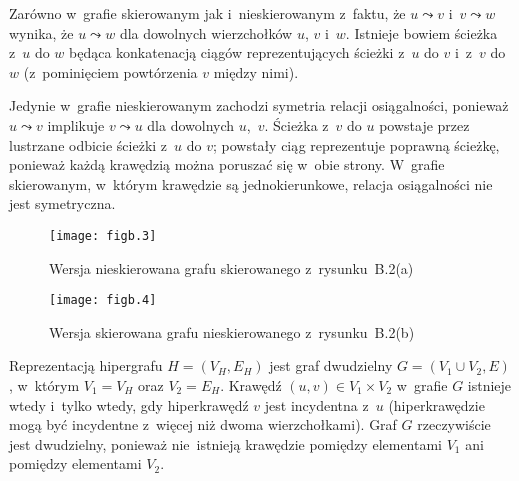 Zarówno w~grafie skierowanym jak i~nieskierowanym z~faktu, że $u\leadsto v$ i~$v\leadsto w$ wynika, że $u\leadsto w$ dla dowolnych wierzchołków $u$, $v$ i~$w$. Istnieje bowiem ścieżka z~$u$ do $w$ będąca konkatenacją ciągów reprezentujących ścieżki z~$u$ do $v$ i~z~$v$ do $w$ (z~pominięciem powtórzenia $v$ między nimi).

Jedynie w~grafie nieskierowanym zachodzi symetria relacji osiągalności, ponieważ $u\leadsto v$ implikuje $v\leadsto u$ dla dowolnych $u$,~$v$. Ścieżka z~$v$ do $u$ powstaje przez lustrzane odbicie ścieżki z~$u$ do $v$; powstały ciąg reprezentuje poprawną ścieżkę, ponieważ każdą krawędzią można poruszać się w~obie strony. W~grafie skierowanym, w~którym krawędzie są jednokierunkowe, relacja osiągalności nie jest symetryczna.

\exercise %
\begin{figure}[ht]
	\begin{center}
		\texttt{[image: figb.3]}
	\end{center}
	\caption{Wersja nieskierowana grafu skierowanego z~rysunku~B.2(a)}
\end{figure}
\begin{figure}[ht]
	\begin{center}
		\texttt{[image: figb.4]}
	\end{center}
	\caption{Wersja skierowana grafu nieskierowanego z~rysunku~B.2(b)}
\end{figure}

\exercise %
Reprezentacją hipergrafu $H=(V_H,E_H)$ jest graf dwudzielny $G=(V_1\cup V_2,E)$, w~którym $V_1=V_H$ oraz $V_2=E_H$. Krawędź $(u,v)\in V_1\times V_2$ w~grafie $G$ istnieje wtedy i~tylko wtedy, gdy hiperkrawędź $v$ jest incydentna z~$u$ (hiperkrawędzie mogą być incydentne z~więcej niż dwoma wierzchołkami). Graf $G$ rzeczywiście jest dwudzielny, ponieważ nie~istnieją krawędzie pomiędzy elementami $V_1$ ani pomiędzy elementami $V_2$.



